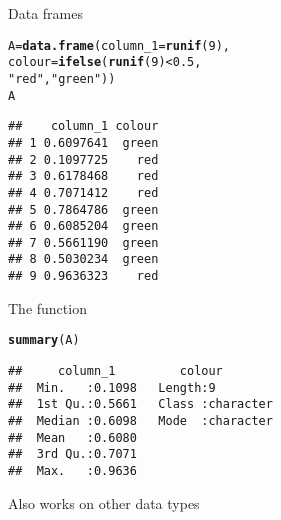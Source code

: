 \documentclass[aspectratio=169]{beamer}\usepackage[]{graphicx}\usepackage[]{xcolor}
\makeatletter
\newcommand{\hlnum}[1]{\textcolor[rgb]{0.686,0.059,0.569}{#1}}%
\newcommand{\hlsng}[1]{\textcolor[rgb]{0.192,0.494,0.8}{#1}}%
\newcommand{\hlopt}[1]{\textcolor[rgb]{0,0,0}{#1}}%
\newcommand{\hldef}[1]{\textcolor[rgb]{0.345,0.345,0.345}{#1}}%
\newcommand{\hlkwb}[1]{\textcolor[rgb]{0.69,0.353,0.396}{#1}}%
\newcommand{\hlkwc}[1]{\textcolor[rgb]{0.333,0.667,0.333}{#1}}%
\newcommand{\hlkwd}[1]{\textcolor[rgb]{0.737,0.353,0.396}{\textbf{#1}}}%
\newenvironment{kframe}{%
 \def\at@end@of@kframe{}%
 \ifinner\ifhmode%
  \def\at@end@of@kframe{\end{minipage}}%
  \begin{minipage}{\columnwidth}%
 \fi\fi%
 \def\FrameCommand##1{\hskip\@totalleftmargin \hskip-\fboxsep
 \colorbox{shadecolor}{##1}\hskip-\fboxsep
     \hskip-\linewidth \hskip-\@totalleftmargin \hskip\columnwidth}%
 \MakeFramed {\advance\hsize-\width
   \@totalleftmargin\z@ \linewidth\hsize
   \@setminipage}}%
 {\par\unskip\endMakeFramed%
 \at@end@of@kframe}
\newenvironment{knitrout}{}{} %
\makeatother
\begin{document}
\begin{frame}[fragile]{Data frames}
\begin{knitrout}
\color{fgcolor}\begin{kframe}
\begin{alltt}
\hldef{A} \hlkwb{=} \hlkwd{data.frame}\hldef{(}\hlkwc{column_1} \hldef{=} \hlkwd{runif}\hldef{(}\hlnum{9}\hldef{),}
               \hlkwc{colour} \hldef{=} \hlkwd{ifelse}\hldef{(}\hlkwd{runif}\hldef{(}\hlnum{9}\hldef{)} \hlopt{<} \hlnum{0.5}\hldef{,}
                               \hlsng{"red"}\hldef{,} \hlsng{"green"}\hldef{))}
\hldef{A}
\end{alltt}
\begin{verbatim}
##    column_1 colour
## 1 0.6097641  green
## 2 0.1097725    red
## 3 0.6178468    red
## 4 0.7071412    red
## 5 0.7864786  green
## 6 0.6085204  green
## 7 0.5661190  green
## 8 0.5030234  green
## 9 0.9636323    red
\end{verbatim}
\end{kframe}
\end{knitrout}
\end{frame}
  
\begin{frame}[fragile]{The  function}
\begin{knitrout}
\color{fgcolor}\begin{kframe}
\begin{alltt}
\hlkwd{summary}\hldef{(A)}
\end{alltt}
\begin{verbatim}
##     column_1         colour         
##  Min.   :0.1098   Length:9          
##  1st Qu.:0.5661   Class :character  
##  Median :0.6098   Mode  :character  
##  Mean   :0.6080                     
##  3rd Qu.:0.7071                     
##  Max.   :0.9636
\end{verbatim}
\end{kframe}
\end{knitrout}
\vfill
Also works on other data types
\end{frame}
\end{document}
